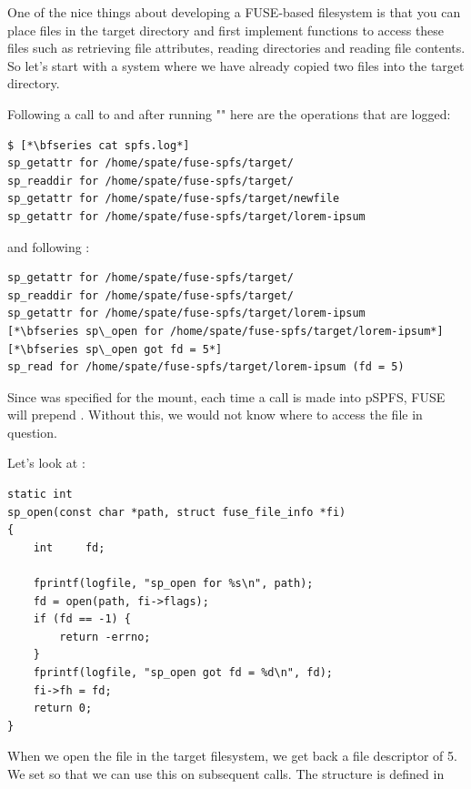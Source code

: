 One of the nice things about developing a FUSE-based filesystem is that you can place files in the target directory and first implement functions to access these files such as retrieving file attributes, reading directories and reading file contents. So let's start with a system where we have already copied two files into the target directory.

Following a call to  and after running "" here are the operations that are logged:

\begin{lstlisting}
$ [*\bfseries cat spfs.log*]
sp_getattr for /home/spate/fuse-spfs/target/
sp_readdir for /home/spate/fuse-spfs/target/
sp_getattr for /home/spate/fuse-spfs/target/newfile
sp_getattr for /home/spate/fuse-spfs/target/lorem-ipsum
\end{lstlisting}

\noindent
and following :

\begin{lstlisting}
sp_getattr for /home/spate/fuse-spfs/target/
sp_readdir for /home/spate/fuse-spfs/target/
sp_getattr for /home/spate/fuse-spfs/target/lorem-ipsum
[*\bfseries sp\_open for /home/spate/fuse-spfs/target/lorem-ipsum*]
[*\bfseries sp\_open got fd = 5*]
sp_read for /home/spate/fuse-spfs/target/lorem-ipsum (fd = 5)
\end{lstlisting}

\noindent
Since  was specified for the mount, each time a call is made into pSPFS, FUSE will prepend . Without this, we would not know where to access the file in question.

Let's look at :

\begin{lstlisting}
static int
sp_open(const char *path, struct fuse_file_info *fi)
{
    int     fd;     
    
    fprintf(logfile, "sp_open for %s\n", path);
    fd = open(path, fi->flags);
    if (fd == -1) { 
        return -errno;
    }
    fprintf(logfile, "sp_open got fd = %d\n", fd);
    fi->fh = fd;    
    return 0;       
}
\end{lstlisting}

\noindent
When we open the file in the target filesystem, we get back a file descriptor  of 5. We set  so that we can use this on subsequent calls. The  structure is defined in 

